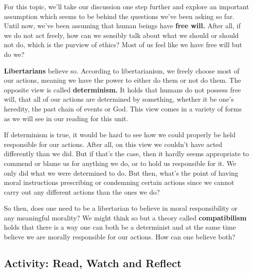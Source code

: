 \documentclass[
]{book}
\begin{document}
For this topic, we'll take our discussion one step further and explore an important assumption which seems to be behind the questions we've been asking so far. Until now, we've been assuming that human beings have \textbf{free will.} After all, if we do not act freely, how can we sensibly talk about what we should or should not do, which is the purview of ethics? Most of us feel like we have free will but do we?

\textbf{Libertarians} believe so. According to libertarianism, we freely choose most of our actions, meaning we have the power to either do them or not do them. The opposite view is called \textbf{determinism.} It holds that humans do not possess free will, that all of our actions are determined by something, whether it be one's heredity, the past chain of events or God. This view comes in a variety of forms as we will see in our reading for this unit.

If determinism is true, it would be hard to see how we could properly be held responsible for our actions. After all, on this view we couldn't have acted differently than we did. But if that's the case, then it hardly seems appropriate to commend or blame us for anything we do, or to hold us responsible for it. We only did what we were determined to do. But then, what's the point of having moral instructions prescribing or condemning certain actions since we cannot carry out any different actions than the ones we do?

So then, does one need to be a libertarian to believe in moral responsibility or any meaningful morality? We might think so but a theory called \textbf{compatibilism} holds that there is a way one can both be a determinist and at the same time believe we are morally responsible for our actions. How can one believe both?

\hypertarget{activity-read-watch-and-reflect-3}{%
\subsection*{Activity: Read, Watch and Reflect}\label{activity-read-watch-and-reflect-3}}
\end{document}
